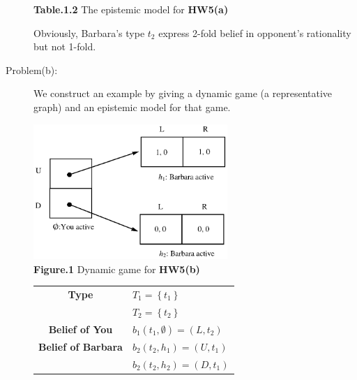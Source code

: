 \documentclass{article}
\begin{document}
\begin{description}
\begin{center}
        {\bf Table.1.2 }The epistemic model for {\bf HW5(a)}
    \end{center}
        Obviously, Barbara's type $t_2$ express 2-fold belief in opponent's rationality but not 1-fold.\\
    \item[Problem(b):]We construct an example by giving a dynamic game (a representative graph) and an epistemic model for that game.
    \begin{center}
                    \includegraphics[angle=0, width=0.6\textwidth]{ECON3160A5P1}\\
                    {\bf Figure.1 } Dynamic game for {\bf HW5(b)}
    \end{center}

    \begin{center}
        \begin{tabular}{cl}
        \hline
        \hline
        \multicolumn{ 1}{c}{{\bf Type}} & $T_1=\left\{t_1\right\}$ \\

        \multicolumn{ 1}{c}{{\bf }} & $T_2=\left\{t_2\right\}$ \\
        \hline
        \multicolumn{ 1}{c}{{\bf Belief of You}} & $b_1\left(t_1,\emptyset \right)=\left(L,t_2\right)$ \\
        \hline
        \multicolumn{ 1}{c}{{\bf Belief of Barbara}} & $b_2\left(t_2,h_1\right)=\left(U,t_1\right)$ \\



        \multicolumn{ 1}{c}{{\bf }} & $b_2\left(t_2,h_2\right)=\left(D,t_1\right)$ \\
        \hline
        \hline
        \end{tabular}


\end{center}
\end{description}
\end{document}
